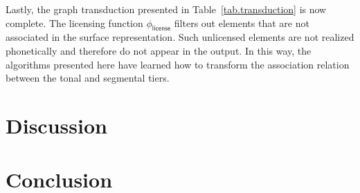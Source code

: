 Lastly, the graph transduction presented in Table~\ref{tab.transduction}
is now complete. The licensing function \(\phi_{\textsf{license}}\)
filters out elements that are not associated in the surface
representation. Such unlicensed elements are not realized phonetically
and therefore do not appear in the output. In this way, the algorithms
presented here have learned how to transform the association relation
between the tonal and segmental tiers.
\section{Discussion}

\section{Conclusion}